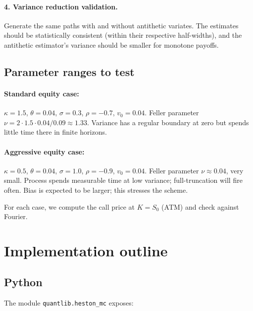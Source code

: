 \documentclass[11pt]{article}
\theoremstyle{plain}
\theoremstyle{definition}
\theoremstyle{remark}
\begin{document}
\paragraph{4. Variance reduction validation.} Generate the same paths with and without antithetic variates. The estimates should be statistically consistent (within their respective half-widths), and the antithetic estimator's variance should be smaller for monotone payoffs.

\subsection{Parameter ranges to test}

\paragraph{Standard equity case:} $\kappa = 1.5$, $\theta = 0.04$, $\sigma = 0.3$, $\rho = -0.7$, $v_0 = 0.04$. Feller parameter $\nu = 2 \cdot 1.5 \cdot 0.04 / 0.09 \approx 1.33$. Variance has a regular boundary at zero but spends little time there in finite horizons.

\paragraph{Aggressive equity case:} $\kappa = 0.5$, $\theta = 0.04$, $\sigma = 1.0$, $\rho = -0.9$, $v_0 = 0.04$. Feller parameter $\nu \approx 0.04$, very small. Process spends measurable time at low variance; full-truncation will fire often. Bias is expected to be larger; this stresses the scheme.

For each case, we compute the call price at $K = S_0$ (ATM) and check against Fourier.

\section{Implementation outline}

\subsection{Python}

The module \texttt{quantlib.heston\_mc} exposes:
\end{document}
